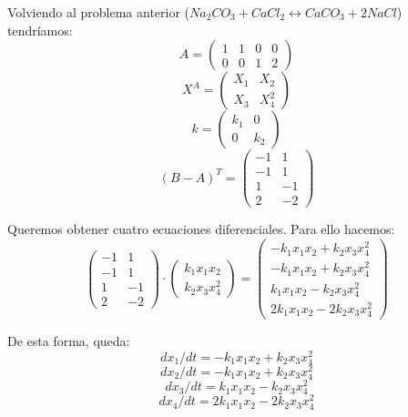 Volviendo al problema anterior ($Na_2CO_3 + CaCl_2 \leftrightarrow CaCO_3 + 2NaCl$) tendríamos:
$$A = \begin{pmatrix}
1 & 1 & 0 & 0 \\
0 & 0 & 1 & 2
\end{pmatrix}$$
$$X^A = \begin{pmatrix}
X_1 & X_2 \\
X_3 & X_4^2 
\end{pmatrix}$$
$$k = \begin{pmatrix}
k_1 & 0 \\
0 & k_2 
\end{pmatrix}$$
$$(B-A)^T = \begin{pmatrix}
-1 & 1 \\ -1 & 1 \\
1 & -1 \\ 2 & -2
\end{pmatrix}$$

Queremos obtener cuatro ecuaciones diferenciales. Para ello hacemos:
$$\begin{pmatrix}
-1 & 1 \\ -1 & 1 \\
1 & -1 \\ 2 & -2
\end{pmatrix} \cdot \begin{pmatrix}
k_1 x_1 x_2 \\
k_2 x_3 x_4^2
\end{pmatrix} = \begin{pmatrix}
-k_1x_1x_2 + k_2x_3x_4^2 \\
-k_1x_1x_2 + k_2x_3x_4^2 \\
k_1x_1x_2 - k_2x_3x_4^2 \\
2k_1x_1x_2 -2 k_2x_3x_4^2 
\end{pmatrix}$$

De esta forma, queda:
$$dx_1/dt = -k_1x_1x_2 + k_2x_3x_4^2 $$
$$dx_2/dt = -k_1x_1x_2 + k_2x_3x_4^2 $$
$$dx_3/dt = k_1x_1x_2 - k_2x_3x_4^2 $$
$$dx_4/dt = 2k_1x_1x_2 -2 k_2x_3x_4^2 $$